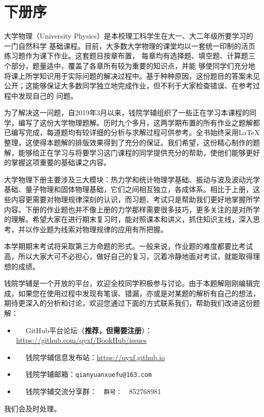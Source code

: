 \maketitle
\pagestyle{plain}
\chapter*{下册序}
大学物理（University Physics）是本校理工科学生在大一、大二年级所要学习的一门自然科学
基础课程。目前，大多数大学物理的课堂均以一套统一印制的活页练习题作为课下作业。这套题目按章布置，
每章均有选择题、填空题、计算题三个部分，题量适中，覆盖了各章所有较为重要的知识点，并能
够使同学们充分地将课上所学知识用于实际问题的解决过程中。基于种种原因，这份题目的答案未见
公开；这能够保证大多数同学独立地完成作业，但不利于大家检查错误、在参考过程中发现自己的
问题。

为了解决这一问题，自2019年3月以来，钱院学辅组织了一些正在学习本课程的同学，编写了这份大学物理题解。历时九个多月，这两学期布置的所有作业之题解都已编写完成，每道题均有较详细的分析与求解过程可供参考。全书始终采用\LaTeX 整理，这使得本题解的排版效果得到了充分的保证。我们希望，这份精心制作的题解，能够给正在学习与将要学习这门课程的同学提供充分的帮助，使他们能够更好的掌握这项重要的基础课之内容。

大学物理下册主要涉及三大模块：热力学和统计物理学基础、振动与波及波动光学基础、量子物理和固体物理基础，它们之间相互独立，各成体系。相比于上册，这些内容更需要对物理规律深刻的认识，而习题、考试只是帮助我们更好地掌握所学内容。下册的作业题也并不像上册的力学那样需要很多技巧，更多关注的是对所学的理解。希望大家在进行期末复习时，能对照课本和讲义，抓住知识主线，深入思考，并以作业题为线索对物理规律的应用有所把握。

本学期期末考试将采取第三方命题的形式。一般来说，作业题的难度都要比考试高，所以大家大可不必担心，做好自己的复习，沉着冷静地面对考试，就能取得理想的成绩。

钱院学辅是一个开放的平台，欢迎全校同学积极参与讨论。由于本题解刚刚编辑完成，如果您在使用过程中发现有笔误、错漏，亦或是对某题的解析有自己的想法，期待更深入的分析和讨论，欢迎您通过下面的方式联系我们，帮助我们改进这份题解：
\begin{itemize}
	\item \faGithub ~~ GitHub平台论坛（\textbf{推荐，但需要注册}）：\url{https://github.com/qyxf/BookHub/issues}
	\item \faInternetExplorer ~~ 钱院学辅信息发布站：\url{https://qyxf.github.io}
	\item \faEnvelopeOpen ~~ 钱院学辅邮箱：\texttt{qianyuanxuefu@163.com}
	\item \faQq ~~ 钱院学辅交流分享群：~~\texttt{群号：}~~852768981
\end{itemize}
我们会及时处理。

